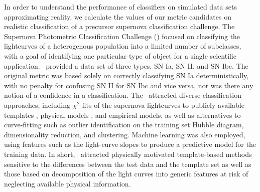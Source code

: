 
In order to understand the performance of classifiers on simulated data sets approximating reality, we calculate the values of our metric candidates on realistic classification of a precursor supernova classification challenge.
The Supernova Photometric Classification Challenge (\snphotcc) \citep{kessler_supernova_2010} focused on classifying the lightcurves of a heterogenous population into a limited number of subclasses, with a goal of identifying one particular type of object for a single scientific application.
\snphotcc\ provided a data set of three types, SN Ia, SN II, and SN Ibc.
The original metric was based solely on correctly classifying SN Ia deterministically, with no penalty for confusing SN II for SN Ibc and vice versa, nor was there any notion of a confidence in a classification.
The \snphotcc\ attracted diverse classification approaches, including $\chi^{2}$ fits of the supernova lightcurves to publicly available templates \citep{nugent_kcorrections_2002}, physical models \citep{conley_sifto:_2008}, and empirical models, as well as alternatives to curve-fitting such as outlier identification on the training set Hubble diagram, dimensionality reduction, and clustering.
Machine learning was also employed, using features such as the light-curve slopes to produce a predictive model for the training data.
In short, \snphotcc\ attracted physically motivated template-based methods sensitive to the differences between the test data and the template set as well as those based on decomposition of the light curves into generic features at risk of neglecting available physical information.

